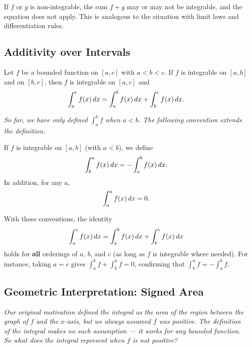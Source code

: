 \begin{remark}[Warning]
If $f$ or $g$ is non-integrable, the sum $f+g$ may or may not be integrable, and the equation does not apply.  This is analogous to the situation with limit laws and differentiation rules.
\end{remark}

\subsection*{Additivity over Intervals}

\begin{theorem}
\label{thm:7-13}
Let $f$ be a bounded function on $[a,c]$ with $a < b < c$.  If $f$ is integrable on $[a,b]$ and on $[b,c]$, then $f$ is integrable on $[a,c]$ and
\[
  \int_{a}^{c} f(x)\,dx = \int_{a}^{b} f(x)\,dx + \int_{b}^{c} f(x)\,dx.
\]
\end{theorem}

\textit{So far, we have only defined $\displaystyle\int_{a}^{b} f$ when $a < b$.  The following convention extends the definition.}

\begin{definition}
\label{def:7-15}
If $f$ is integrable on $[a,b]$ (with $a < b$), we define
\[
  \int_{b}^{a} f(x)\,dx = -\int_{a}^{b} f(x)\,dx.
\]
In addition, for any $a$,
\[
  \int_{a}^{a} f(x)\,dx = 0.
\]
\end{definition}

\begin{remark}
With these conventions, the identity
\[
  \int_{a}^{c} f(x)\,dx = \int_{a}^{b} f(x)\,dx + \int_{b}^{c} f(x)\,dx
\]
holds for \textbf{all} orderings of $a$, $b$, and $c$ (as long as $f$ is integrable where needed).  For instance, taking $a = c$ gives $\displaystyle\int_{a}^{b} f + \int_{b}^{a} f = 0$, confirming that $\displaystyle\int_{b}^{a} f = -\int_{a}^{b} f$.
\end{remark}

\subsection*{Geometric Interpretation: Signed Area}

\textit{Our original motivation defined the integral as the area of the region between the graph of $f$ and the $x$-axis, but we always assumed $f$ was positive.  The definition of the integral makes no such assumption --- it works for any bounded function.  So what does the integral represent when $f$ is not positive?}

